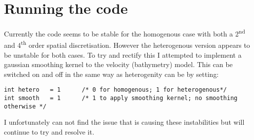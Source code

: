 \documentclass{article}
\begin{document}
\section{Running the code}
Currently the code seems to be stable for the homogenous case with both a 2\textsuperscript{nd} and 4\textsuperscript{th} order spatial discretisation. However the heterogenous version appears to be unstable for both cases. To try and rectify this I attempted to implement a gaussian smoothing kernel to the velocity (bathymetry) model. This can be switched on and off in the same way as heterogenity can be by setting:  
\begin{verbatim}
int hetero   = 1      /* 0 for homogenous; 1 for heterogenous*/
int smooth   = 1      /* 1 to apply smoothing kernel; no smoothing otherwise */
\end{verbatim}

I unfortunately can not find the issue that is causing these instabilities but will continue to try and resolve it. 
\end{document}
